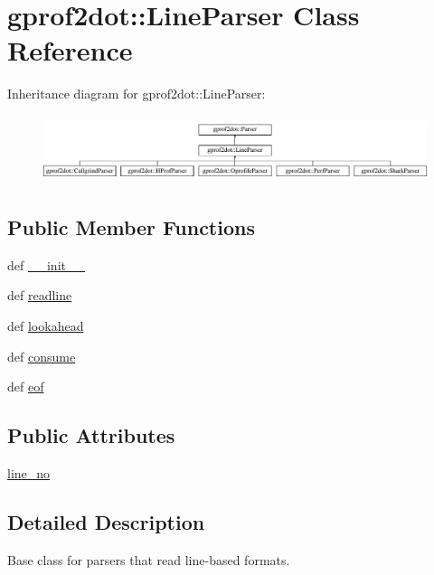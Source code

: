 \hypertarget{classgprof2dot_1_1LineParser}{
\section{gprof2dot::LineParser Class Reference}
\label{classgprof2dot_1_1LineParser}
}
Inheritance diagram for gprof2dot::LineParser:\begin{figure}[H]
\begin{center}
\leavevmode
\includegraphics[height=1.988166cm]{classgprof2dot_1_1LineParser}
\end{center}
\end{figure}
\subsection*{Public Member Functions}
\begin{DoxyCompactItemize}
\item 
def \hyperlink{classgprof2dot_1_1LineParser_a9ab24f364f64a70181dd4156cea194c5}{\_\-\_\-init\_\-\_\-}
\item 
def \hyperlink{classgprof2dot_1_1LineParser_aca122098675f8464f11a287ab3660795}{readline}
\item 
def \hyperlink{classgprof2dot_1_1LineParser_ac8ee85c45c20f2a1b041b96b89bdf34c}{lookahead}
\item 
def \hyperlink{classgprof2dot_1_1LineParser_a39083cedf3f4f3ed40a410815f393942}{consume}
\item 
def \hyperlink{classgprof2dot_1_1LineParser_a84fe7464a543da7c585a247f4d603123}{eof}
\end{DoxyCompactItemize}
\subsection*{Public Attributes}
\begin{DoxyCompactItemize}
\item 
\hyperlink{classgprof2dot_1_1LineParser_aab8c55a9d00cb279553751f524e147f2}{line\_\-no}
\end{DoxyCompactItemize}


\subsection{Detailed Description}
\begin{DoxyVerb}Base class for parsers that read line-based formats.\end{DoxyVerb}
 

